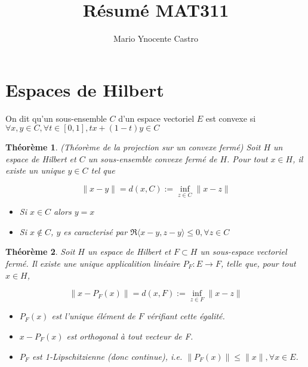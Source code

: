 \documentclass[10pt,a4paper,oneside]{article}
\newtheorem{theoreme}{Théorème}
\newenvironment{definition}[1][Definition]{\begin{trivlist}
\item[\hskip \labelsep {\bfseries #1}]}{\end{trivlist}}
\begin{document}
\title{Résumé MAT311}
\author{Mario Ynocente Castro}

\maketitle

\section{Espaces de Hilbert}

\begin{definition}
On dit qu'un sous-ensemble $C$ d'un espace vectoriel $E$ est convexe si
$\forall x,y \in C, \forall t \in [0,1], tx + (1 - t)y \in C$
\end{definition}

\begin{theoreme}
(Théorème de la projection sur un convexe fermé) Soit $H$ un espace de Hilbert et $C$ un sous-ensemble convexe fermé de $H$. Pour tout $x \in H$, il existe un unique $y \in C$ tel que

\[
\| x - y \| = d(x,C) := \inf_{z \in C} \| x - z \|
\]

\begin{itemize}

\item
Si $x \in C$ alors $y = x$

\item
Si $x \not\in C$, $y$ es caracterisé par $\Re \langle x - y,z - y \rangle \leq 0, \forall z \in C$

\end{itemize}

\end{theoreme}


\begin{theoreme}
Soit $H$ un espace de Hilbert et $F \subset H$ un sous-espace vectoriel fermé. Il existe une unique applicalition linéaire $P_F: E \to F$, telle que, pour tout $x \in H$,

\[ \| x - P_F(x) \| = d(x,F) := \inf_{z \in F} \| x - z \| \]

\begin{itemize}
\item
$P_F(x)$ est l'unique élément de $F$ vérifiant cette égalité.

\item
$x - P_F(x)$ est orthogonal à tout vecteur de F.

\item
$P_F$ est 1-Lipschitzienne (donc continue), i.e. $\| P_F(x) \| \leq \| x \|, \forall x \in E$.

\end{itemize}

\end{theoreme}
\end{document}
